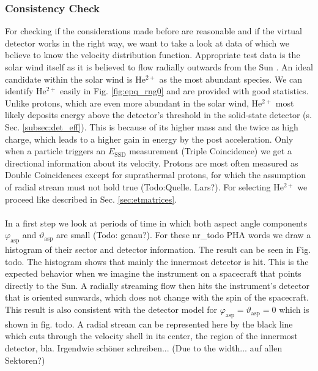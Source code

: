 \subsubsection{Consistency Check}
\label{sec:consis}
For checking if the considerations made before are reasonable and if the virtual detector works in the right way, we want to take a look at data of which we believe to know the velocity distribution function. Appropriate test data is the solar wind itself as it is believed to flow radially outwards from the Sun \citep[][,Ch. 6.1]{prlss_2004}. An ideal candidate within the solar wind is $\mathrm{He^{2+}}$ as the most abundant species. We can identify $\mathrm{He^{2+}}$ easily in Fig. \ref{fig:epq_rng0} and are provided with good statistics. Unlike protons, which are even more abundant in the solar wind, $\mathrm{He^{2+}}$ most likely deposits energy above the detector's threshold in the solid-state detector (s. Sec. \ref{subsec:det_eff}). This is because of its higher mass and the twice as high charge, which leads to a higher gain in energy by the post acceleration. Only when a particle triggers an $E_{\mathrm{SSD}}$ measurement (Triple Coincidence) we get a directional information about its velocity. Protons are most often measured as Double Coincidences except for suprathermal protons, for which the assumption of radial stream must not hold true (Todo:Quelle. Lars?). For selecting $\mathrm{He^{2+}}$ we proceed like described in Sec. \ref{sec:etmatrices}.
\\ \\
In a first step we look at periods of time in which both aspect angle components $\varphi_{\mathrm{asp}}$ and $\vartheta_{\mathrm{asp}}$ are small (Todo: genau?). For these nr\_todo PHA words we draw a histogram of their sector and detector information. The result can be seen in Fig. todo. The histogram shows that mainly the innermost detector is hit. This is the expected behavior when we imagine the instrument on a spacecraft that points directly to the Sun. A radially streaming flow then hits the instrument's detector that is oriented sunwards, which does not change with the spin of the spacecraft. This result is also consistent with the detector model for $\varphi_{\mathrm{asp}} = \vartheta_{\mathrm{asp}} = 0$ which is shown in fig. todo. A radial stream can be represented here by the black line which cuts through the velocity shell in its center, the region of the innermost detector, bla. Irgendwie schöner schreiben...
(Due to the width... auf allen Sektoren?)
\\ \\
